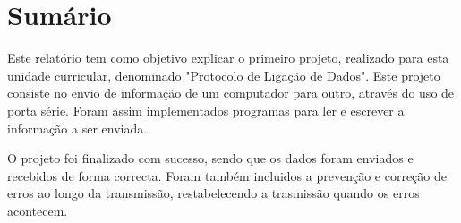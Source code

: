 \documentclass[11pt]{article}
\begin{document}

\newpage

%
%
%
%
%
%
%


\section{Sumário}

Este relatório tem como objetivo explicar o primeiro projeto, realizado para esta unidade curricular, denominado "Protocolo de Ligação de Dados". Este projeto consiste no envio de informação de um computador para outro, através do uso de porta série. Foram assim implementados programas para ler e escrever a informação a ser enviada.
\par O projeto foi finalizado com sucesso, sendo que os dados foram enviados e recebidos de forma correcta. Foram também incluidos a prevenção e correção de erros ao longo da transmissão, restabelecendo a trasmissão quando os erros acontecem.
\end{document}
